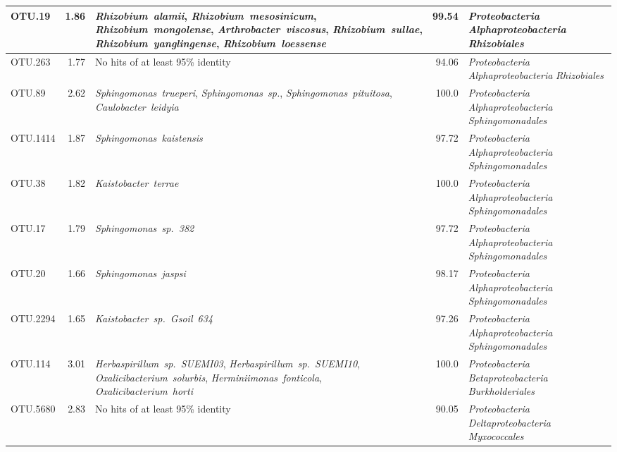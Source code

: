 \documentclass[10pt]{article}
\begin{document}
\begin{ThreePartTable}
\begin{longtable}{lrP{5cm}rP{7cm}}
OTU.19 & 1.86 & \mbox{\textit{Rhizobium alamii}}, \mbox{\textit{Rhizobium mesosinicum}}, \mbox{\textit{Rhizobium mongolense}}, \mbox{\textit{Arthrobacter viscosus}}, \mbox{\textit{Rhizobium sullae}}, \mbox{\textit{Rhizobium yanglingense}}, \mbox{\textit{Rhizobium loessense}} & 99.54 & \mbox{\textit{Proteobacteria}} \mbox{\textit{Alphaproteobacteria}} \mbox{\textit{Rhizobiales}} \\ \midrule
OTU.263 & 1.77 & {No hits of at least 95\% identity} & 94.06 & \mbox{\textit{Proteobacteria}} \mbox{\textit{Alphaproteobacteria}} \mbox{\textit{Rhizobiales}} \\ \midrule
OTU.89 & 2.62 & \mbox{\textit{Sphingomonas trueperi}}, \mbox{\textit{Sphingomonas sp.}}, \mbox{\textit{Sphingomonas pituitosa}}, \mbox{\textit{Caulobacter leidyia}} & 100.0 & \mbox{\textit{Proteobacteria}} \mbox{\textit{Alphaproteobacteria}} \mbox{\textit{Sphingomonadales}} \\ \midrule
OTU.1414 & 1.87 & \mbox{\textit{Sphingomonas kaistensis}} & 97.72 & \mbox{\textit{Proteobacteria}} \mbox{\textit{Alphaproteobacteria}} \mbox{\textit{Sphingomonadales}} \\ \midrule
OTU.38 & 1.82 & \mbox{\textit{Kaistobacter terrae}} & 100.0 & \mbox{\textit{Proteobacteria}} \mbox{\textit{Alphaproteobacteria}} \mbox{\textit{Sphingomonadales}} \\ \midrule
OTU.17 & 1.79 & \mbox{\textit{Sphingomonas sp. 382}} & 97.72 & \mbox{\textit{Proteobacteria}} \mbox{\textit{Alphaproteobacteria}} \mbox{\textit{Sphingomonadales}} \\ \midrule
OTU.20 & 1.66 & \mbox{\textit{Sphingomonas jaspsi}} & 98.17 & \mbox{\textit{Proteobacteria}} \mbox{\textit{Alphaproteobacteria}} \mbox{\textit{Sphingomonadales}} \\ \midrule
OTU.2294 & 1.65 & \mbox{\textit{Kaistobacter sp. Gsoil 634}} & 97.26 & \mbox{\textit{Proteobacteria}} \mbox{\textit{Alphaproteobacteria}} \mbox{\textit{Sphingomonadales}} \\ \midrule
OTU.114 & 3.01 & \mbox{\textit{Herbaspirillum sp. SUEMI03}}, \mbox{\textit{Herbaspirillum sp. SUEMI10}}, \mbox{\textit{Oxalicibacterium solurbis}}, \mbox{\textit{Herminiimonas fonticola}}, \mbox{\textit{Oxalicibacterium horti}} & 100.0 & \mbox{\textit{Proteobacteria}} \mbox{\textit{Betaproteobacteria}} \mbox{\textit{Burkholderiales}} \\ \midrule
OTU.5680 & 2.83 & {No hits of at least 95\% identity} & 90.05 & \mbox{\textit{Proteobacteria}} \mbox{\textit{Deltaproteobacteria}} \mbox{\textit{Myxococcales}} \\ \midrule

\end{longtable}
\end{ThreePartTable}
\end{document}
